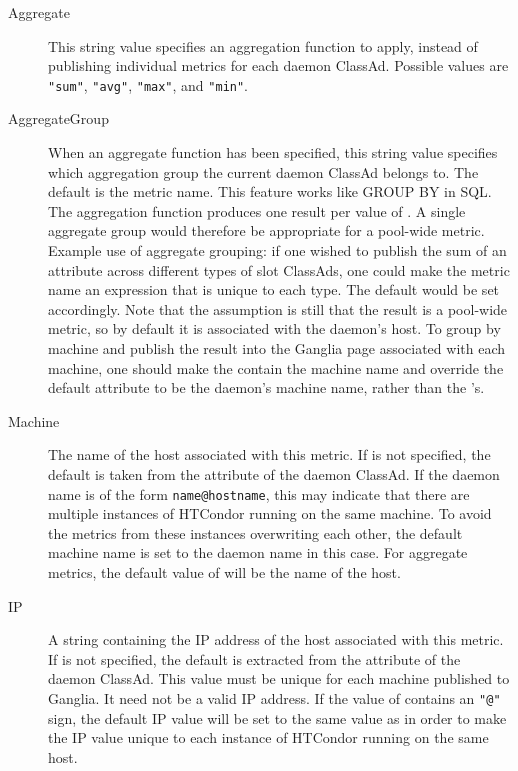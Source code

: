 \begin{description}
  \item[Aggregate] This string value specifies an aggregation function
    to apply, instead of publishing individual metrics for each daemon
    ClassAd.  Possible values are \verb|"sum"|, \verb|"avg"|, \verb|"max"|,
    and \verb|"min"|.

  \item[AggregateGroup] When an aggregate function has been specified,
    this string value specifies which aggregation group the current
    daemon ClassAd belongs to.  The default is the metric name.  This
    feature works like GROUP BY in SQL.  The aggregation function
    produces one result per value of .  A single
    aggregate group would therefore be appropriate for a pool-wide
    metric.  Example use of aggregate grouping: if one wished to
    publish the sum of an attribute across different types of slot
    ClassAds, one could make the metric name an expression that is unique
    to each type.  The default  would be set
    accordingly.  Note that the assumption is still that the result
    is a pool-wide metric, so by default it is associated with the
     daemon's host.
    To group by machine and publish the result into
    the Ganglia page associated with each machine, one should make
    the  contain the machine name and override
    the default  attribute to be the daemon's machine
    name, rather than the 's.

  \item[Machine] The name of the host associated with this metric.  If
     is not specified, the default
    is taken from the  attribute of the daemon ClassAd.
    If the daemon name is of the form \verb|name@hostname|, this may
    indicate that there are multiple instances of HTCondor running on
    the same machine.  To avoid the metrics from these instances
    overwriting each other, the default machine name is set to the
    daemon name in this case.  For aggregate metrics, the default
    value of  will be the name of the  host.

  \item[IP] A string containing the IP address of the host associated
    with this metric.  If  is not
    specified, the default is extracted from the 
    attribute of the daemon ClassAd.  This value must be unique for each
    machine published to Ganglia.  It need not be a valid IP address.
    If the value of  contains an \verb|"@"| sign, the
    default IP value will be set to the same value as 
    in order to make the IP value unique to each instance of HTCondor
    running on the same host.

  \end{description}

